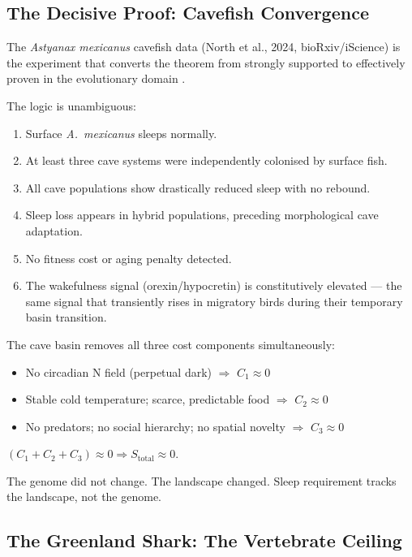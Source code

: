 \documentclass[12pt, a4paper]{article}
\begin{document}
\subsection{The Decisive Proof: Cavefish Convergence}

The \textit{Astyanax mexicanus} cavefish data (North et al.,
2024, bioRxiv/iScience) is the experiment that converts the
theorem from strongly supported to effectively proven in the
evolutionary domain \cite{north2024}.

The logic is unambiguous:

\begin{enumerate}
    \item Surface \textit{A.\ mexicanus} sleeps normally.
    \item At least three cave systems were independently
          colonised by surface fish.
    \item All cave populations show drastically reduced
          sleep with no rebound.
    \item Sleep loss appears in hybrid populations,
          preceding morphological cave adaptation.
    \item No fitness cost or aging penalty detected.
    \item The wakefulness signal (orexin/hypocretin) is
          constitutively elevated --- the same signal that
          transiently rises in migratory birds during their
          temporary basin transition.
\end{enumerate}

The cave basin removes all three cost components
simultaneously:
\begin{itemize}
    \item No circadian N field (perpetual dark) $\Rightarrow$ $C_1 \approx 0$
    \item Stable cold temperature; scarce, predictable food
          $\Rightarrow$ $C_2 \approx 0$
    \item No predators; no social hierarchy; no spatial
          novelty $\Rightarrow$ $C_3 \approx 0$
\end{itemize}

\noindent$(C_1 + C_2 + C_3) \approx 0 \Rightarrow S_{\text{total}} \approx 0$.

The genome did not change. The landscape changed.
Sleep requirement tracks the landscape, not the genome.

\subsection{The Greenland Shark: The Vertebrate Ceiling}
\end{document}

